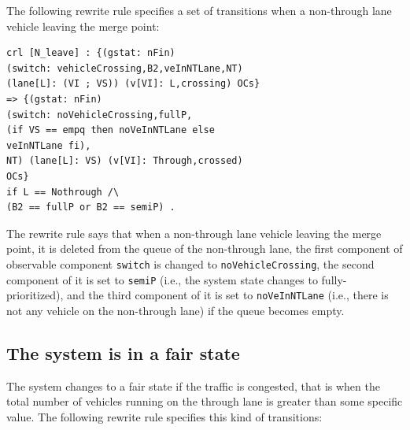 \documentclass[10pt, conference, compsocconf]{IEEEtran}
\begin{document}
The following rewrite rule specifies a set of transitions when a non-through lane vehicle leaving the merge point:

\begin{small}
\begin{verbatim}
crl [N_leave] : {(gstat: nFin) 
(switch: vehicleCrossing,B2,veInNTLane,NT)
(lane[L]: (VI ; VS)) (v[VI]: L,crossing) OCs} 
=> {(gstat: nFin) 
(switch: noVehicleCrossing,fullP,
(if VS == empq then noVeInNTLane else 
veInNTLane fi),
NT) (lane[L]: VS) (v[VI]: Through,crossed) 
OCs} 
if L == Nothrough /\ 
(B2 == fullP or B2 == semiP) .
\end{verbatim}
\end{small}

\noindent
The rewrite rule says that when a non-through lane vehicle leaving the merge point, it is deleted from the queue of the non-through lane, the first component of observable component \verb!switch! is changed to \verb!noVehicleCrossing!, the second component of it is set to \verb!semiP! (i.e., the system state changes to fully-prioritized), and the third component of it is set to \verb!noVeInNTLane! (i.e., there is not any vehicle on the non-through lane) if the queue becomes empty.



\subsection{The system is in a fair state}
The system changes to a fair state if the traffic is congested, that is when the total number of vehicles running on the through lane is greater than some specific value.
The following rewrite rule specifies this kind of transitions:

%

\end{document}
